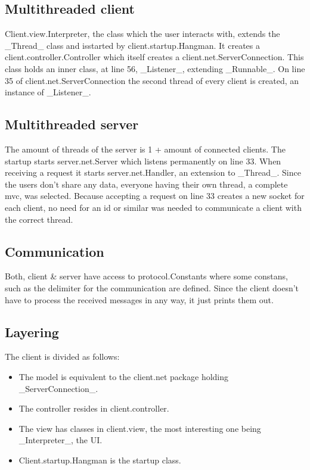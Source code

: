 \documentclass[a4paper]{scrartcl}
\begin{document}
\subsection{Multithreaded client}

Client.view.Interpreter, the class which the user interacts with, extends the _Thread_ class and isstarted by client.startup.Hangman.
It creates a client.controller.Controller which itself creates a client.net.ServerConnection.
This class holds an inner class, at line 56, _Listener_, extending _Runnable_.
On line 35 of client.net.ServerConnection the second thread of every client is created, an instance of _Listener_.

\subsection{Multithreaded server}

The amount of threads of the server is 1 + amount of connected clients.
The startup starts server.net.Server which listens permanently on line 33.
When receiving a request it starts server.net.Handler, an extension to _Thread_.
Since the users don't share any data, everyone having their own thread, a complete mvc, was selected.
Because accepting a request on line 33 creates a new socket for each client, no need for an id or similar was needed to communicate a client with the correct thread.


\subsection{Communication}
Both, client \& server have access to protocol.Constants where some constans, such as the delimiter for the communication are defined.
Since the client doesn't have to process the received messages in any way, it just prints them out.

\subsection{Layering}
The client is divided as follows:
\begin{itemize}
    \item The model is equivalent to the client.net package holding _ServerConnection_.
    \item The controller resides in client.controller.
    \item The view has classes in client.view, the most interesting one being _Interpreter_, the UI.
    \item Client.startup.Hangman is the startup class.
\end{itemize}
\end{document}
